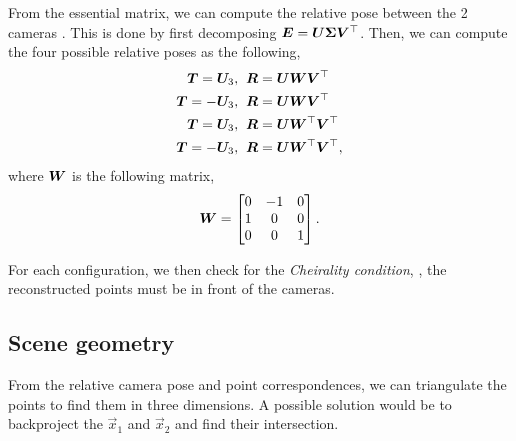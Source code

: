 From the essential matrix, we can compute the relative pose between the 2 cameras
\citep{longuet1981computer}. This is done by first decomposing $\bm{E} =
    \bm{U} \bm{\Sigma} \bm{V}^\top$. Then, we
can compute the four possible relative poses as the following,
\begin{align*}
    \bm{T} = \bm{U}_3,  & \hspace{0.2cm} \bm{R} = \bm{U}\bm{W}\bm{V}^\top              \\
    \bm{T} = -\bm{U}_3, & \hspace{0.2cm} \bm{R} = \bm{U}\bm{W}\bm{V}^\top              \\
    \bm{T} = \bm{U}_3,  & \hspace{0.2cm} \bm{R} = \bm{U}\bm{W}^\top\bm{V}^\top  \\
    \bm{T} = -\bm{U}_3, & \hspace{0.2cm} \bm{R} = \bm{U}\bm{W}^\top\bm{V}^\top,
\end{align*}
where $\bm{W}$ is the following matrix, \[
    \bm{W} = \begin{bmatrix}
        0 & -1 & 0 \\
        1 & 0  & 0 \\
        0 & 0  & 1
    \end{bmatrix}.
\]

For each configuration, we then check for the \textit{Cheirality condition},
\ie, the reconstructed points must be in front of the cameras.

\subsection{Scene geometry}

From the relative camera pose and point correspondences, we can triangulate the
points to find them in three dimensions. A possible solution would be to
backproject the $\vec{x}_1$ and $\vec{x}_2$ and find their intersection.

